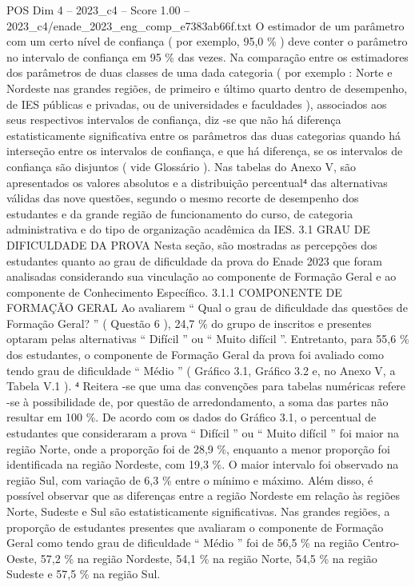\begin{textsample}{POS Dim 4 – 2023\_c4 – Score 1.00 – 2023\_c4/enade\_2023\_eng\_comp\_e7383ab66f.txt}
O estimador de um parâmetro com um certo nível de confiança ( por exemplo, 95,0 \% ) deve conter o parâmetro no intervalo de confiança em 95 \% das vezes.
Na comparação entre os estimadores dos parâmetros de duas classes de uma dada categoria ( por exemplo : Norte e Nordeste nas grandes regiões, de primeiro e último quarto dentro de desempenho, de IES públicas e privadas, ou de universidades e faculdades ), associados aos seus respectivos intervalos de confiança, diz -se que não há diferença estatisticamente significativa entre os parâmetros das duas categorias quando há interseção entre os intervalos de confiança, e que há diferença, se os intervalos de confiança são disjuntos ( vide Glossário ).
Nas tabelas do Anexo V, são apresentados os valores absolutos e a distribuição percentual⁴ das alternativas válidas das nove questões, segundo o mesmo recorte de desempenho dos estudantes e da grande região de funcionamento do curso, de categoria administrativa e do tipo de organização acadêmica da IES. 3.1 GRAU DE DIFICULDADE DA PROVA Nesta seção, são mostradas as percepções dos estudantes quanto ao grau de dificuldade da prova do Enade 2023 que foram analisadas considerando sua vinculação ao componente de Formação Geral e ao componente de Conhecimento Específico. 3.1.1 COMPONENTE DE FORMAÇÃO GERAL Ao avaliarem “ Qual o grau de dificuldade das questões de Formação Geral? ” ( Questão 6 ), 24,7 \% do grupo de inscritos e presentes optaram pelas alternativas “ Difícil ” ou “ Muito difícil ”.
Entretanto, para 55,6 \% dos estudantes, o componente de Formação Geral da prova foi avaliado como tendo grau de dificuldade “ Médio ” ( Gráfico 3.1, Gráfico 3.2 e, no Anexo V, a Tabela V.1 ). ⁴ Reitera -se que uma das convenções para tabelas numéricas refere -se à possibilidade de, por questão de arredondamento, a soma das partes não resultar em 100 \%.
De acordo com os dados do Gráfico 3.1, o percentual de estudantes que consideraram a prova “ Difícil ” ou “ Muito difícil ” foi maior na região Norte, onde a proporção foi de 28,9 \%, enquanto a menor proporção foi identificada na região Nordeste, com 19,3 \%.
O maior intervalo foi observado na região Sul, com variação de 6,3 \% entre o mínimo e máximo.
Além disso, é possível observar que as diferenças entre a região Nordeste em relação às regiões Norte, Sudeste e Sul são estatisticamente significativas.
Nas grandes regiões, a proporção de estudantes presentes que avaliaram o componente de Formação Geral como tendo grau de dificuldade “ Médio ” foi de 56,5 \% na região Centro-Oeste, 57,2 \% na região Nordeste, 54,1 \% na região Norte, 54,5 \% na região Sudeste e 57,5 \% na região Sul.

\end{textsample}
